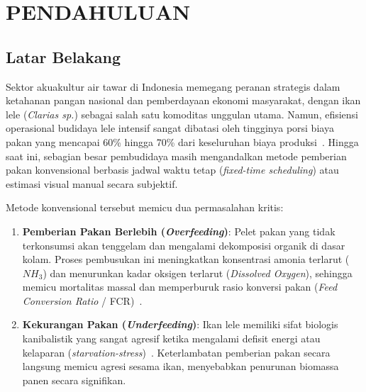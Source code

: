 \section{PENDAHULUAN}
\label{sec:pendahuluan}

\subsection{Latar Belakang}
Sektor akuakultur air tawar di Indonesia memegang peranan strategis dalam ketahanan pangan nasional dan pemberdayaan ekonomi masyarakat, dengan ikan lele (\textit{Clarias sp.}) sebagai salah satu komoditas unggulan utama. Namun, efisiensi operasional budidaya lele intensif sangat dibatasi oleh tingginya porsi biaya pakan yang mencapai 60\% hingga 70\% dari keseluruhan biaya produksi~\cite{Li2020}. Hingga saat ini, sebagian besar pembudidaya masih mengandalkan metode pemberian pakan konvensional berbasis jadwal waktu tetap (\textit{fixed-time scheduling}) atau estimasi visual manual secara subjektif.

Metode konvensional tersebut memicu dua permasalahan kritis:
\begin{enumerate}
    \item \textbf{Pemberian Pakan Berlebih (\textit{Overfeeding})}: Pelet pakan yang tidak terkonsumsi akan tenggelam dan mengalami dekomposisi organik di dasar kolam. Proses pembusukan ini meningkatkan konsentrasi amonia terlarut ($NH_3$) dan menurunkan kadar oksigen terlarut (\textit{Dissolved Oxygen}), sehingga memicu mortalitas massal dan memperburuk rasio konversi pakan (\textit{Feed Conversion Ratio} / FCR)~\cite{Zhou2018}.
    \item \textbf{Kekurangan Pakan (\textit{Underfeeding})}: Ikan lele memiliki sifat biologis kanibalistik yang sangat agresif ketika mengalami defisit energi atau kelaparan (\textit{starvation-stress})~\cite{Marliza2021}. Keterlambatan pemberian pakan secara langsung memicu agresi sesama ikan, menyebabkan penurunan biomassa panen secara signifikan.
\end{enumerate}

